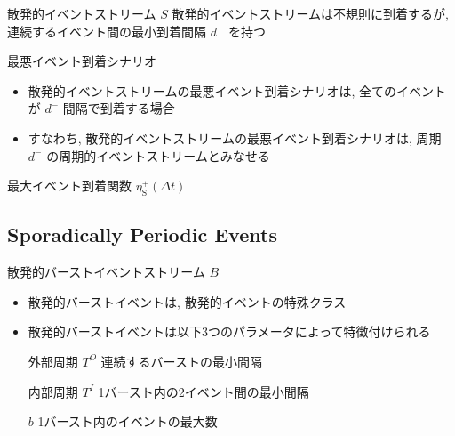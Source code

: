 \begin{frame}{散発的イベントストリーム $S$}
    散発的イベントストリームは不規則に到着するが, 連続するイベント間の最小到着間隔 $d^{-}$ を持つ
\end{frame}

\begin{frame}{最悪イベント到着シナリオ}
    \begin{itemize}
        \item 散発的イベントストリームの最悪イベント到着シナリオは, 全てのイベントが $d^{-}$ 間隔で到着する場合
        \item すなわち, 散発的イベントストリームの最悪イベント到着シナリオは, 周期 $d^{-}$ の周期的イベントストリームとみなせる
    \end{itemize}
\end{frame}

\begin{frame}{最大イベント到着関数 $\eta_{\mathrm{S}}^{+}(\Delta t)$}
\end{frame}


\subsection{Sporadically Periodic Events}
\label{ssec: sporadically periodic events}

\begin{frame}{散発的バーストイベントストリーム $B$}
    \begin{itemize}
        \item 散発的バーストイベントは, 散発的イベントの特殊クラス
        \item 散発的バーストイベントは以下3つのパラメータによって特徴付けられる
              \begin{block}{外部周期 $T^{O}$}
                  連続するバーストの最小間隔
              \end{block}
              \begin{block}{内部周期 $T^{I}$}
                1バースト内の2イベント間の最小間隔
            \end{block}
            \begin{block}{$b$}
                1バースト内のイベントの最大数
            \end{block}
    \end{itemize}
\end{frame}

